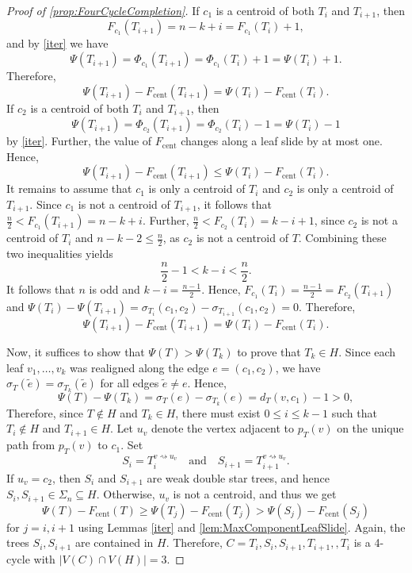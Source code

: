 \documentclass[10pt,a4paper]{amsart}
\begin{document}
\begin{proof} [Proof of \autoref{prop:FourCycleCompletion}]
			If $c_1$ is a centroid of both $T_i$ and $T_{i+1}$, then 
			\[
				F_{c_1} (T_{i+1}) = n - k + i = F_{c_1} (T_i) + 1,
			\]
			and by \autoref{iter} we have
			\[
				\Psi(T_{i+1}) = \Phi_{c_1}(T_{i+1}) = \Phi_{c_1} (T_i) + 1 = \Psi(T_i) + 1.
			\]
			Therefore, 
			\[
				\Psi(T_{i+1}) - F_\mathrm{cent} (T_{i+1}) = \Psi(T_i) - F_\mathrm{cent} (T_i).
			\]
			If $c_2$ is a centroid of both $T_i$ and $T_{i+1}$, then 
			\[
				\Psi(T_{i+1}) = \Phi_{c_2}(T_{i+1}) = \Phi_{c_2} (T_i) - 1 = \Psi(T_i) - 1
			\]
			by \autoref{iter}. Further, the value of $F_\mathrm{cent}$ changes along a leaf slide by at most one. Hence, 
			\[
				\Psi(T_{i+1}) - F_\mathrm{cent} (T_{i+1}) \leq \Psi(T_i) - F_\mathrm{cent} (T_i).
			\]
			It remains to assume that $c_1$ is only a centroid of $T_i$ and $c_2$ is only a centroid of $T_{i+1}$. Since $c_1$ is not a centroid of $T_{i+1}$, it follows that $\frac{n}{2} < F_{c_1}(T_{i+1}) = n-k+i$. Further, $\frac{n}{2} < F_{c_2}(T_i) = k-i+1$, since $c_2$ is not a centroid of $T_i$ and $n-k-2 \leq \frac{n}{2}$, as $c_2$ is not a centroid of $T$. Combining these two inequalities yields
			\[
				\frac{n}{2} - 1 < k-i < \frac{n}{2}.
			\]
			It follows that $n$ is odd and $k-i = \frac{n-1}{2}$. Hence, $F_{c_1}(T_i) = \frac{n-1}{2} = F_{c_2}(T_{i+1})$ and $\Psi(T_i)-\Psi(T_{i+1}) = \sigma_{T_i}(c_1,c_2) - \sigma_{T_{i+1}}(c_1,c_2) = 0$. Therefore,
			\[
				\Psi(T_{i+1}) - F_\mathrm{cent} (T_{i+1}) = \Psi(T_i) - F_\mathrm{cent} (T_i).
			\]

			Now, it suffices to show that $\Psi(T) > \Psi(T_k)$ to prove that $T_k\in H$. Since each leaf $v_1,\ldots,v_k$ was realigned along the edge $e = (c_1, c_2)$, we have $\sigma_T (\tilde{e}) = \sigma_{T_k} (\tilde{e})$ for all edges $\tilde{e}\neq e$. Hence,
			\[
				\Psi(T) - \Psi(T_k) = \sigma_T (e) - \sigma_{T_k} (e) = d_T(v,c_1) - 1 > 0,
			\]
			Therefore, since $T\notin H$ and $T_k\in H$, there must exist $0\leq i \leq k-1$ such that $T_i\notin H$ and $T_{i+1}\in H$. Let $u_v$ denote the vertex adjacent to $p_T(v)$ on the unique path from $p_T(v)$ to $c_1$. Set
			\[
				S_i = T_i^{v\rightsquigarrow u_v} \quad \text{and} \quad S_{i+1} = T_{i+1}^{v\rightsquigarrow u_v}.
			\]
			If $u_v = c_2$, then $S_i$ and $S_{i+1}$ are weak double star trees, and hence $S_i, S_{i+1} \in \Sigma_n \subseteq H$. Otherwise, $u_v$ is not a centroid, and thus we get 
			\[
				\Psi(T) - F_\mathrm{cent} (T) \geq \Psi(T_j) - F_\mathrm{cent} (T_j) > \Psi(S_j) - F_\mathrm{cent} (S_j)
			\] 
			for $j = i, i+1$ using Lemmas \ref{iter} and \ref{lem:MaxComponentLeafSlide}. Again, the trees $S_i, S_{i+1}$ are contained in $H$. Therefore, $C = T_i, S_i, S_{i+1}, T_{i+1},, T_i$ is a 4-cycle with $|V(C) \cap V(H)| = 3$.
		\end{proof}
\end{document}
